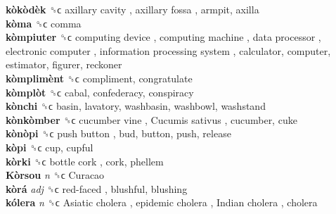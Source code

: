 \textbf{kòkòdèk} ␝ϲ   axillary cavity ,  axillary fossa , armpit, axilla  \\
\textbf{kòma} ␝ϲ  comma  \\
\textbf{kòmpiuter} ␝ϲ   computing device ,  computing machine ,  data processor ,  electronic computer ,  information processing system , calculator, computer, estimator, figurer, reckoner  \\
\textbf{kòmplimènt} ␝ϲ  compliment, congratulate  \\
\textbf{kòmplòt} ␝ϲ  cabal, confederacy, conspiracy  \\
\textbf{kònchi} ␝ϲ  basin, lavatory, washbasin, washbowl, washstand  \\
\textbf{kònkòmber} ␝ϲ   cucumber vine ,  Cucumis sativus , cucumber, cuke  \\
\textbf{kònòpi} ␝ϲ   push button , bud, button, push, release  \\
\textbf{kòpi} ␝ϲ  cup, cupful  \\
\textbf{kòrki} ␝ϲ   bottle cork , cork, phellem  \\
\textbf{Kòrsou} \emph{n}  ␝ϲ   Curacao   \\
\textbf{kòrá} \emph{adj}  ␝ϲ   red-faced , blushful, blushing  \\
\textbf{kólera} \emph{n}  ␝ϲ   Asiatic cholera ,  epidemic cholera ,  Indian cholera , cholera  \\

